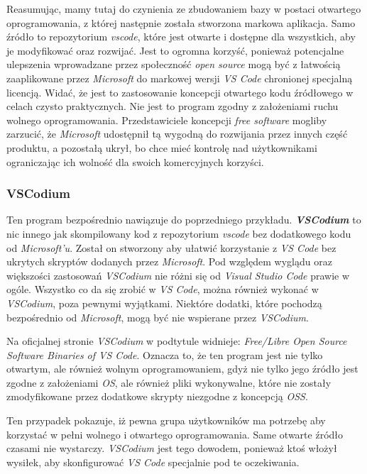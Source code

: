 \documentclass{article}
\begin{document}
Reasumując, mamy tutaj do czynienia ze zbudowaniem bazy w postaci otwartego oprogramowania, z której następnie została stworzona markowa aplikacja. Samo źródło to repozytorium \emph{vscode}, które jest otwarte i dostępne dla wszystkich, aby je modyfikować oraz rozwijać. Jest to ogromna korzyść, ponieważ potencjalne ulepszenia wprowadzane przez społeczność \emph{open source} mogą być z łatwością zaaplikowane przez \emph{Microsoft} do markowej wersji \emph{VS Code} chronionej specjalną licencją. Widać, że jest to zastosowanie koncepcji otwartego kodu źródłowego w celach czysto praktycznych. Nie jest to program zgodny z założeniami ruchu wolnego oprogramowania. Przedstawiciele koncepcji \emph{free software} mogliby zarzucić, że \emph{Microsoft} udostępnił tą wygodną do rozwijania przez innych część produktu, a pozostałą ukrył, bo chce mieć kontrolę nad użytkownikami ograniczając ich wolność dla swoich komercyjnych korzyści.

\subsubsection{VSCodium}

\hspace{4mm} Ten program bezpośrednio nawiązuje do poprzedniego przykładu. \textbf{\emph{VSCodium}} to nic innego jak skompilowany kod z repozytorium \emph{vscode} bez dodatkowego kodu od \emph{Microsoft'u}. Został on stworzony aby ułatwić korzystanie z \emph{VS Code} bez ukrytych skryptów dodanych przez \emph{Microsoft}. Pod względem wyglądu oraz większości zastosowań \emph{VSCodium} nie różni się od \emph{Visual Studio Code} prawie w ogóle. Wszystko co da się zrobić w \emph{VS Code}, można również wykonać w \emph{VSCodium}, poza pewnymi wyjątkami. Niektóre dodatki, które pochodzą bezpośrednio od \emph{Microsoft}, mogą być nie wspierane przez \emph{VSCodium}\cite{vscodium.article}. 

Na oficjalnej stronie \emph{VSCodium} w podtytule widnieje: \emph{Free/Libre Open Source Software Binaries of VS Code}. Oznacza to, że ten program jest nie tylko otwartym, ale również wolnym oprogramowaniem, gdyż nie tylko jego źródło jest zgodne z założeniami \emph{OS}, ale również pliki wykonywalne, które nie zostały zmodyfikowane przez dodatkowe skrypty niezgodne z koncepcją \emph{OSS}\cite{vscodium.website}.

Ten przypadek pokazuje, iż pewna grupa użytkowników ma potrzebę aby korzystać w pełni wolnego i otwartego oprogramowania. Same otwarte źródło czasami nie wystarczy. \emph{VSCodium} jest tego dowodem, ponieważ ktoś włożył wysiłek, aby skonfigurować \emph{VS Code} specjalnie pod te oczekiwania.
\end{document}
